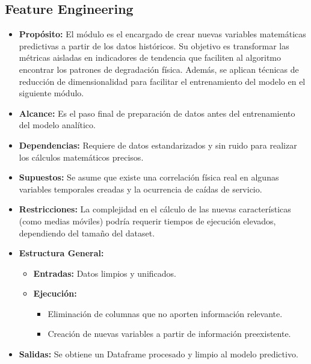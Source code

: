 \documentclass[12pt,a4paper]{article}
\begin{document}
    \subsection{Feature Engineering}
    \begin{itemize}
        \item \textbf{Propósito:} El módulo es el encargado de crear nuevas variables matemáticas predictivas a partir de los datos históricos. Su objetivo es transformar las métricas aisladas
        en indicadores de tendencia que faciliten al algoritmo encontrar los patrones de degradación física. Además, se aplican técnicas de reducción de dimensionalidad para facilitar el entrenamiento del
        modelo en el siguiente módulo.
        \item \textbf{Alcance:} Es el paso final de preparación de datos antes del entrenamiento del modelo analítico.
        \item \textbf{Dependencias:} Requiere de datos estandarizados y sin ruido para realizar los cálculos matemáticos precisos.
        \item \textbf{Supuestos:} Se asume que existe una correlación física real en algunas variables temporales creadas y la ocurrencia de caídas de servicio.
        \item \textbf{Restricciones:} La complejidad en el cálculo de las nuevas características (como medias móviles) podría requerir tiempos de ejecución elevados, dependiendo del tamaño del dataset.
        \item \textbf{Estructura General:}
        \begin{itemize}
            \item \textbf{Entradas:} Datos limpios y unificados.
            \item \textbf{Ejecución:}
             \begin{itemize}
                \item Eliminación de columnas que no aporten información relevante.
                \item Creación de nuevas variables a partir de información preexistente.
            \end{itemize}
        \end{itemize}
        \item \textbf{Salidas:} Se obtiene un Dataframe procesado y limpio al modelo predictivo.
    \end{itemize}
\end{document}

